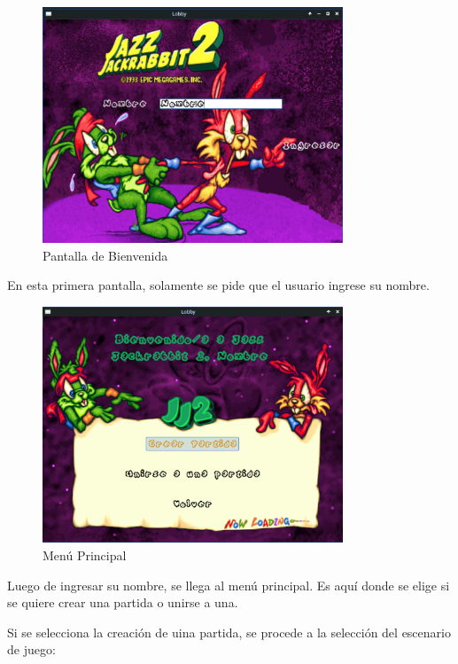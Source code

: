 \documentclass[titlepage,a4paper]{article}
\begin{document}
\begin{figure}[H]
  \centering
  \includegraphics[width=0.8\textwidth]{images/Lobby/Welcome.png}
  \caption{Pantalla de Bienvenida}
  \label{fig:welcome}
\end{figure}

En esta primera pantalla, solamente se pide que el usuario ingrese su nombre. 

\begin{figure}[H]
  \centering
  \includegraphics[width=0.8\textwidth]{images/Lobby/Lobby.png}
  \caption{Menú Principal}
  \label{fig:lobby}
\end{figure}

Luego de ingresar su nombre, se llega al menú principal. Es aquí donde se elige si se quiere crear una partida o unirse a una.

Si se selecciona la creación de uina partida, se procede a la selección del escenario de juego:
\end{document}
